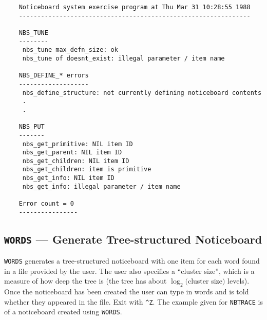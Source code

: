 \documentclass[twoside,11pt]{article}
\renewcommand{\_}{\texttt{\symbol{95}}}
\begin{document}
\begin {verbatim}
    Noticeboard system exercise program at Thu Mar 31 10:28:55 1988
    ---------------------------------------------------------------

    NBS_TUNE
    --------
     nbs_tune max_defn_size: ok
     nbs_tune of doesnt_exist: illegal parameter / item name

    NBS_DEFINE_* errors
    -------------------
     nbs_define_structure: not currently defining noticeboard contents
     .
     .

    NBS_PUT
    -------
     nbs_get_primitive: NIL item ID
     nbs_get_parent: NIL item ID
     nbs_get_children: NIL item ID
     nbs_get_children: item is primitive
     nbs_get_info: NIL item ID
     nbs_get_info: illegal parameter / item name

    Error count = 0
    ----------------
\end{verbatim}

\subsection {{\tt WORDS} --- Generate Tree-structured Noticeboard}

{\tt WORDS} generates a tree-structured noticeboard with one item for each
word found in a file provided by the user. The user also specifies a ``cluster
size'', which is a measure of how deep the tree is (the tree has about
$\log_{2} ($cluster size$)$ levels). Once the noticeboard has been created
the user can type in words and is told whether they appeared in the file.
Exit with \verb|^Z|. The example given for {\tt NBTRACE} is of a noticeboard
created using {\tt WORDS}.
\end{document}
